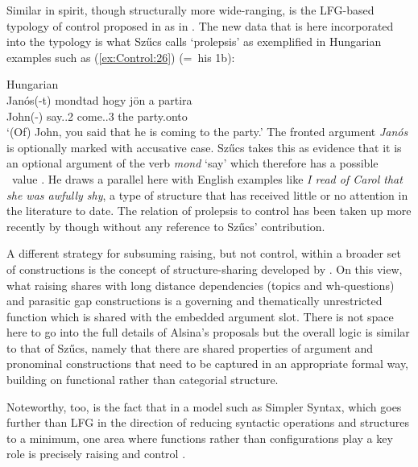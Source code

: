 \documentclass[output=paper,hidelinks]{langscibook}
\begin{document}
Similar in spirit, though structurally more wide-ranging, is the LFG-based typology of control proposed in \citet{Szucs2018a} as in . The new data that is here incorporated into the typology is what Sz\H{u}cs calls `prolepsis' as exemplified in Hungarian examples such as (\ref{ex:Control:26}) (=~his 1b):

\ea\label{ex:Control:26} Hungarian\\
\gll Janós(-t)   mondtad   hogy  jön     a  partira\\
John(-\ACC)  {say.\PST.2\SG}     {come.\PRS.3\SG}  the party.onto\\
\glt`(Of) John, you said that he is coming to the party.'
\z
The fronted argument \emph{Janós} is optionally marked with accusative case. Sz\H{u}cs takes this as evidence that it is an optional argument of the verb \emph{mond} `say' which therefore has a possible \PRED\ value \arglist{(\SUBJ)(\OBJ)(\COMP)}. He draws a parallel here with English examples like \emph{I read of Carol that she was awfully shy}, a type of structure that has received little or no attention in the literature to date. The relation of prolepsis to control has been taken up more recently by \citet[§14.4.5]{Landau2021} though without any reference to Sz\H{u}cs' contribution.

A different strategy for subsuming raising, but not control, within a broader set of constructions is the concept of structure-sharing developed by \citet{alsina2008,Alsina:Raising}. On this view, what raising shares with long distance dependencies (topics and wh-questions) and parasitic gap constructions is a governing and thematically unrestricted function which is shared with the embedded argument slot. There is not space here to go into the full details of Alsina's proposals but the overall logic is similar to that of Sz\H{u}cs, namely that there are shared properties of argument and pronominal constructions that need to be captured in an appropriate formal way, building on functional rather than categorial structure.

Noteworthy, too, is the fact that in a model such as Simpler Syntax, which goes further than LFG in the direction of reducing syntactic operations and structures to a minimum, one area where functions rather than configurations play a key role is precisely raising and control \citep[§3.3]{CulicoverJackendoff2019}.
\end{document}
